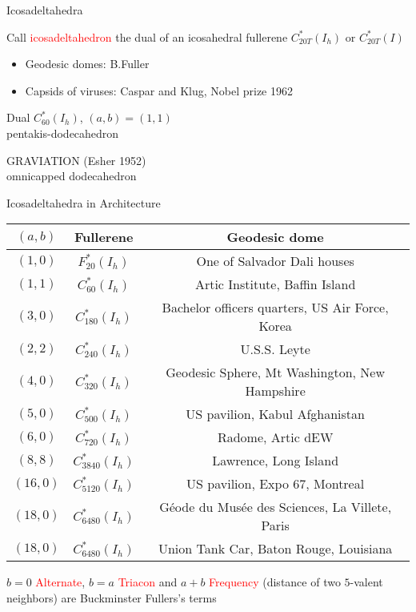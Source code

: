 \documentclass[%
pdf,
colorBG,
slideColor,
]{prosper}
\begin{document}
\begin{slide}{Icosadeltahedra}

Call \textcolor{red}{icosadeltahedron} the dual of an icosahedral fullerene $C_{20T}^*(I_h)$ or $C_{20T}^*(I)$
\begin{itemize}
\item Geodesic domes: B.Fuller
\item Capsids of viruses: Caspar and Klug, Nobel prize 1962
\end{itemize}

\begin{center}
\begin{minipage}[b]{5.5cm}
\centering
{}\par
Dual $C_{60}^{*}(I_h)$, $(a,b)=(1,1)$\\
pentakis-dodecahedron
\end{minipage}
\begin{minipage}[b]{5.5cm}
\centering
{}\par
GRAVIATION (Esher 1952)\\
omnicapped dodecahedron
\end{minipage}
\end{center}


\end{slide}


\begin{slide}{Icosadeltahedra in Architecture}
\begin{center}
{\tiny
\begin{tabular}{|c|c|c|}
\hline
$(a,b)$&Fullerene  & Geodesic dome\\
\hline
$(1,0)$& $F_{20}^*(I_h)$&One of Salvador Dali houses\\
$(1,1)$& $C_{60}^*(I_h)$&Artic Institute, Baffin Island\\
$(3,0)$& $C_{180}^*(I_h)$&Bachelor officers quarters, US Air Force, Korea\\
$(2,2)$& $C_{240}^*(I_h)$&U.S.S. Leyte\\
$(4,0)$& $C_{320}^*(I_h)$&Geodesic Sphere, Mt Washington, New Hampshire\\
$(5,0)$& $C_{500}^*(I_h)$&US pavilion, Kabul Afghanistan\\
$(6,0)$& $C_{720}^*(I_h)$&Radome, Artic dEW\\
$(8,8)$& $C_{3840}^*(I_h)$&Lawrence, Long Island\\
$(16,0)$& $C_{5120}^*(I_h)$&US pavilion, Expo 67, Montreal\\
$(18,0)$& $C_{6480}^*(I_h)$&G\'eode du Mus\'ee des Sciences, La Villete, Paris\\
$(18,0)$& $C_{6480}^*(I_h)$&Union Tank Car, Baton Rouge, Louisiana\\
\hline
\end{tabular}
}
\end{center}
$b=0$ \textcolor{red}{Alternate}, $b=a$ \textcolor{red}{Triacon} and $a+b$ \textcolor{red}{Frequency} (distance of 
two $5$-valent neighbors) are Buckminster Fullers's terms

\end{slide}
\end{document}
